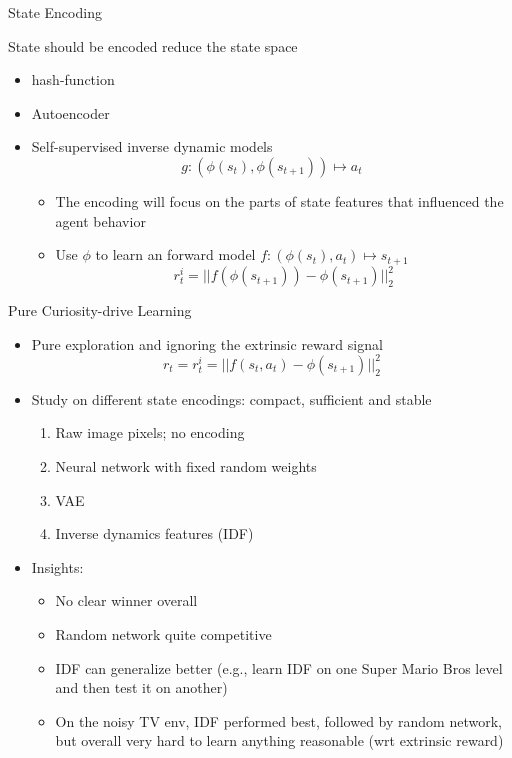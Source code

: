 \begin{frame}[c]{State Encoding}
	

	State should be encoded reduce the state space
	\begin{itemize}
		\item hash-function~
		\item Autoencoder~
		\item Self-supervised inverse dynamic models~
		$$g: (\phi(s_t), \phi(s_{t+1})) \mapsto a_t $$
		\begin{itemize}
			\item The encoding will focus on the parts of state features that influenced the agent behavior
			\item Use $\phi$ to learn an forward model $f: (\phi(s_t), a_t) \mapsto s_{t+1}$
			$$ r_t^i = || f(\phi(s_{t+1})) - \phi(s_{t+1})||^2_2$$
		\end{itemize}
	\end{itemize}
	
	
\end{frame}
\begin{frame}[c]{Pure Curiosity-drive Learning~}
	
	
	\begin{itemize}
		\item Pure exploration and ignoring the extrinsic reward signal
		$$r_t  = r_t^i = ||f(s_t, a_t) - \phi(s_{t+1}) ||_2^2 $$
		\item Study on different state encodings: compact, sufficient and stable
		\begin{enumerate}
			\item Raw image pixels; no encoding
			\item Neural network with fixed random weights
			\item VAE
			\item Inverse dynamics features (IDF)
		\end{enumerate}
		\item Insights:
		\begin{itemize}
			\item No clear winner overall
			\item Random network quite competitive
			\item IDF can generalize better (e.g., learn IDF on one Super Mario Bros level and then test it on another)
			\item On the noisy TV env, IDF performed best, followed by random network, but overall very hard to learn anything reasonable (wrt extrinsic reward)
		\end{itemize}
	\end{itemize}
	
	
\end{frame}
